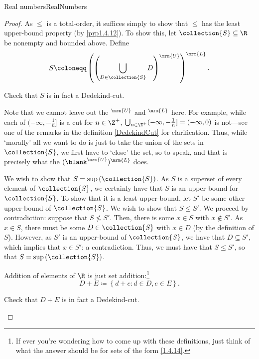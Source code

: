 \begin{thm}{Real numbers}{RealNumbers}
\begin{proof}
As $\leq$ is a total-order, it suffices simply to show that $\leq$ has the least upper-bound property (by \cref{prp1.4.12}).  To show this, let $\collection{S}\subseteq \R$ be nonempty and bounded above.  Define
\begin{equation}
S\coloneqq \left( \left( \bigcup _{D\in \collection{S}}D\right) ^{\mrm{U}}\right) ^{\mrm{L}}.
\end{equation}
\begin{exr}[breakable=false]{}{}
Check that $S$ is in fact a Dedekind-cut.
\begin{rmk}
Note that we cannot leave out the $^{\mrm{U}}$ and $^{\mrm{L}}$ here.  For example, while each of $(-\infty ,-\frac{1}{n}]$ is a cut for $n\in \Z ^+$, $\bigcup _{n\in \Z ^+}(-\infty ,-\frac{1}{n}]=(-\infty ,0)$ is not---see one of the remarks in the definition \cref{DedekindCut} for clarification.  Thus, while `morally' all we want to do is just to take the union of the sets in $\collection{S}$, we first have to `close' the set, so to speak, and that is precisely what the $(\blank ^{\mrm{U}})^{\mrm{L}}$ does.
\end{rmk}
\end{exr}
We wish to show that $S=\sup \left( \collection{S}\right)$.  As $S$ is a superset of every element of $\collection{S}$, we certainly have that $S$ is an upper-bound for $\collection{S}$.  To show that it is a least upper-bound, let $S'$ be some other upper-bound of $\collection{S}$.  We wish to show that $S\leq S'$.  We proceed by contradiction:  suppose that $S\not \leq S'$.  Then, there is some $x\in S$ with $x\notin S'$.  As $x\in S$, there must be some $D\in \collection{S}$ with $x\in D$ (by the definition of $S$).  However, as $S'$ is an upper-bound of $\collection{S}$, we have that $D\subseteq S'$, which implies that $x\in S'$:  a contradiction.  Thus, we must have that $S\leq S'$, so that $S=\sup \left( \collection{S}\right)$.

Addition of elements of $\R$ is just set addition:\footnote{If ever you're wondering how to come up with these definitions, just think of what the answer should be for sets of the form \eqref{1.4.14}.}
\begin{equation}
D+E\coloneqq \left\{ d+e:d\in D,e\in E\right\} .
\end{equation}
\begin{exr}[breakable=false]{}{}
Check that $D+E$ is in fact a Dedekind-cut.
\end{exr}


\end{proof}
\end{thm}
